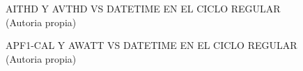 \begin{figure}[H]
  \hfill
  \hfill
  \hfill
  \caption{AITHD Y AVTHD VS DATETIME EN EL CICLO REGULAR (Autoria propia)}
  \end{figure}
\begin{figure}[H]
  \hfill
  \hfill
  \hfill
  \caption{APF1-CAL Y AWATT VS DATETIME EN EL CICLO REGULAR (Autoria propia)}
  \end{figure}
